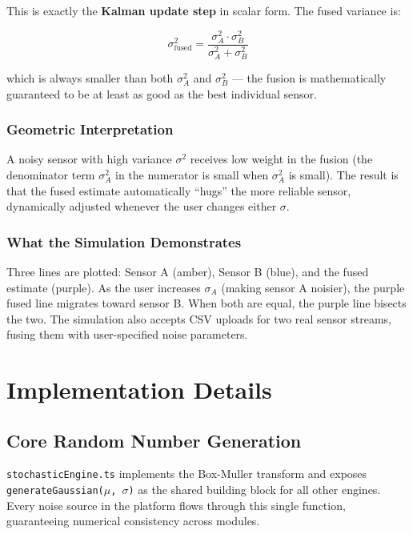 \documentclass[12pt, a4paper]{article}
\begin{document}
This is exactly the \textbf{Kalman update step} in scalar form. The fused variance is:

\begin{equation}
  \sigma_\text{fused}^2 = \frac{\sigma_A^2 \cdot \sigma_B^2}{\sigma_A^2 + \sigma_B^2}
\end{equation}

which is always smaller than both $\sigma_A^2$ and $\sigma_B^2$ --- the fusion is
mathematically guaranteed to be at least as good as the best individual sensor.

\subsubsection{Geometric Interpretation}

A noisy sensor with high variance $\sigma^2$ receives low weight in the fusion
(the denominator term $\sigma_A^2$ in the numerator is small when $\sigma_A^2$ is
small). The result is that the fused estimate automatically ``hugs'' the more reliable
sensor, dynamically adjusted whenever the user changes either $\sigma$.

\subsubsection{What the Simulation Demonstrates}

Three lines are plotted: Sensor A (amber), Sensor B (blue), and the fused estimate
(purple). As the user increases $\sigma_A$ (making sensor A noisier), the purple
fused line migrates toward sensor B. When both are equal, the purple line bisects the
two. The simulation also accepts CSV uploads for two real sensor streams, fusing them
with user-specified noise parameters.

\section{Implementation Details}

\subsection{Core Random Number Generation}

\texttt{stochasticEngine.ts} implements the Box-Muller transform and exposes
\texttt{generateGaussian($\mu$, $\sigma$)} as the shared building block for all other
engines. Every noise source in the platform flows through this single function,
guaranteeing numerical consistency across modules.
\end{document}

